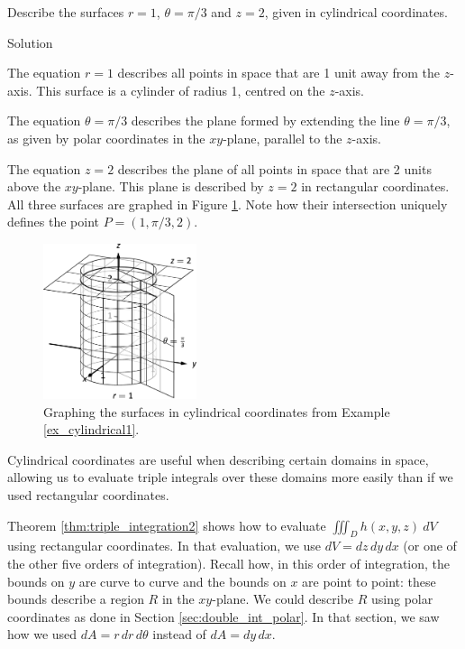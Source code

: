 \begin{example}
\label{ex_cylindrical1}Describe the surfaces $r=1$, $\theta = \pi/3$ and $z=2$, given in cylindrical coordinates.

Solution 

The equation $r=1$ describes all points in space that are 1 unit away from the $z$-axis. This surface is a cylinder of radius 1, centred on the $z$-axis. 

The equation $\theta=\pi/3$ describes the plane formed by extending the line $\theta=\pi/3$, as given by polar coordinates in the $xy$-plane, parallel to the $z$-axis.

The equation $z=2$ describes the plane of all points in space that are 2 units above the $xy$-plane. This plane is described by $z=2$ in rectangular coordinates. All three surfaces are graphed in Figure \ref{fig_multiple_28}. Note how their intersection uniquely defines the point $P=(1,\pi/3,2)$.

\begin{figure}[H]
	\begin{center}
			\includegraphics[width=0.4\textwidth]{fig_multiple_28}
	\caption{Graphing the surfaces in cylindrical coordinates from Example \ref{ex_cylindrical1}.}
	\label{fig_multiple_28}
	\end{center}
\end{figure}

\end{example}


Cylindrical coordinates are useful when describing certain domains in space, allowing us to evaluate triple integrals over these domains more easily than if we used rectangular coordinates.

Theorem \ref{thm:triple_integration2} shows how to evaluate $\iiint_Dh(x,y,z)\ dV$ using rectangular coordinates. In that evaluation, we use $dV = dz\,dy\,dx$ (or one of the other five orders of integration). Recall how, in this order of integration, the bounds on $y$ are curve to curve and the bounds on $x$ are point to point: these bounds describe a region $R$ in the $xy$-plane. We could describe $R$ using polar coordinates as done in Section \ref{sec:double_int_polar}. In that section, we saw how we used $dA = r\,dr\,d\theta$ instead of $dA = dy\,dx$. 

